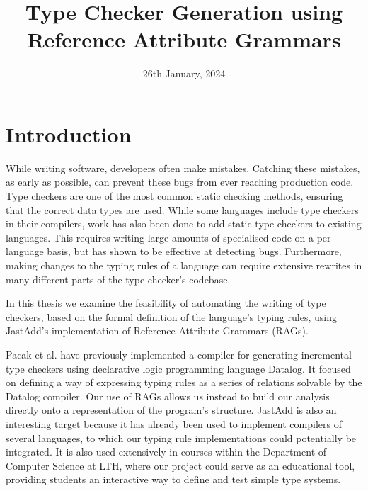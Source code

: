 \documentclass[nofilelist]{cslthse-msc}
\title{Type Checker Generation using Reference Attribute Grammars}
\date{26th January, 2024}
\newcommand{\CR}[1]{\textcolor{green!60!black}{[\textbf{CR}:#1]}}
\begin{document}
\renewcommand{\bibname}{References}

\makefrontmatter
\chapter{Introduction} %
While writing software, developers often make mistakes.
Catching these mistakes, as early as possible, can prevent these bugs from ever reaching production code.
Type checkers are one of the most common static checking methods, ensuring that the correct data types are used.
While some languages include type checkers in their compilers, work has also been done to add static type checkers to existing languages.
This requires writing large amounts of specialised code on a per language basis, but has shown to be effective at detecting bugs\cite{10.1145/1985793.1985889}\cite{10.5555/1251375.1251384}\cite{10190394}.
Furthermore, making changes to the typing rules of a language can require extensive rewrites in many different parts of the type checker's codebase.

In this thesis we examine the feasibility of automating the writing of type checkers, based on the formal definition of the language's typing rules, using JastAdd's implementation of Reference Attribute Grammars (RAGs).

Pacak et al. have previously implemented a compiler for generating incremental type checkers using declarative logic programming language Datalog\cite{Pacak}.
It focused on defining a way of expressing typing rules as a series of relations solvable by the Datalog compiler.
Our use of RAGs allows us instead to build our analysis directly onto a representation of the program's structure.
JastAdd is also an interesting target because it has already been used to implement compilers of several languages, to which our typing rule implementations could potentially be integrated.
It is also used extensively in courses within the Department of Computer Science at LTH, where our project could serve as an educational tool, providing students an interactive way to define and test simple type systems.
\end{document}
